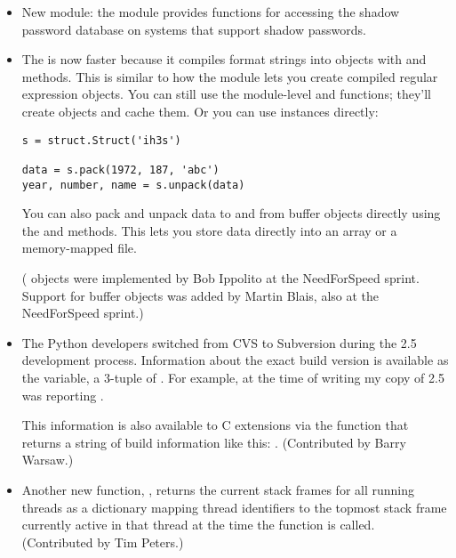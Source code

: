 \documentclass{howto}
\begin{document}
\begin{itemize}
\item New module: the  module provides functions for
accessing the shadow password database on systems that support 
shadow passwords.

\item The  is now faster because it 
compiles format strings into  objects
with  and  methods.  This is similar
to how the  module lets you create compiled regular
expression objects.  You can still use the module-level 
 and  functions; they'll create 
 objects and cache them.  Or you can use 
 instances directly:

\begin{verbatim}
s = struct.Struct('ih3s')

data = s.pack(1972, 187, 'abc')
year, number, name = s.unpack(data)
\end{verbatim}

You can also pack and unpack data to and from buffer objects directly
using the  and 
methods.  This lets you store data directly into an array or a
memory-mapped file.

( objects were implemented by Bob Ippolito at the
NeedForSpeed sprint.  Support for buffer objects was added by Martin
Blais, also at the NeedForSpeed sprint.)

\item The Python developers switched from CVS to Subversion during the 2.5
development process.  Information about the exact build version is
available as the  variable, a 3-tuple of
.  For example, at the time of writing my copy
of 2.5 was reporting .

This information is also available to C extensions via the 
 function that returns a 
string of build information like this:
.  
(Contributed by Barry Warsaw.)

\item Another new function, , returns
the current stack frames for all running threads as a dictionary
mapping thread identifiers to the topmost stack frame currently active
in that thread at the time the function is called.  (Contributed by
Tim Peters.)


\end{itemize}
\end{document}
